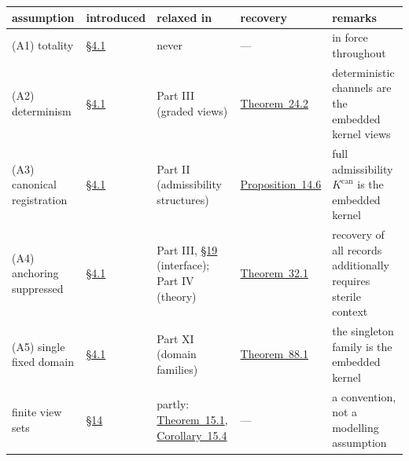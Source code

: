 {\def\LTcaptype{none} %
\begin{longtable}[]{@{}
  >{\raggedright\arraybackslash}p{}
  >{\raggedright\arraybackslash}p{}
  >{\raggedright\arraybackslash}p{}
  >{\raggedright\arraybackslash}p{}
  >{\raggedright\arraybackslash}p{}@{}}
\toprule\noalign{}
\begin{minipage}[b]{\linewidth}\raggedright
assumption
\end{minipage} & \begin{minipage}[b]{\linewidth}\raggedright
introduced
\end{minipage} & \begin{minipage}[b]{\linewidth}\raggedright
relaxed in
\end{minipage} & \begin{minipage}[b]{\linewidth}\raggedright
recovery
\end{minipage} & \begin{minipage}[b]{\linewidth}\raggedright
remarks
\end{minipage} \\
\midrule\noalign{}
\endhead
\bottomrule\noalign{}
\endlastfoot
(A1) totality & \hyperlink{sec:4.1}{§4.1} & never & ---\hspace{0pt} & in force throughout \\
(A2) determinism & \hyperlink{sec:4.1}{§4.1} & Part III (graded views) & \hyperlink{stmt:24.2}{Theorem~24.2} & deterministic channels are the embedded kernel views \\
(A3) canonical registration & \hyperlink{sec:4.1}{§4.1} & Part II (admissibility structures) & \hyperlink{stmt:14.6}{Proposition~14.6} & full admissibility \(K^{\mathrm{can}}\) is the embedded kernel \\
(A4) anchoring suppressed & \hyperlink{sec:4.1}{§4.1} & Part III, \hyperlink{sec:19}{§19} (interface); Part IV (theory) & \hyperlink{stmt:32.1}{Theorem~32.1} & recovery of all records additionally requires sterile context \\
(A5) single fixed domain & \hyperlink{sec:4.1}{§4.1} & Part XI (domain families) & \hyperlink{stmt:88.1}{Theorem~88.1} & the singleton family is the embedded kernel \\
finite view sets & \hyperlink{sec:14}{§14} & partly: \hyperlink{stmt:15.1}{Theorem~15.1}, \hyperlink{stmt:15.4}{Corollary~15.4} & ---\hspace{0pt} & a convention, not a modelling assumption \\

\end{longtable}}
